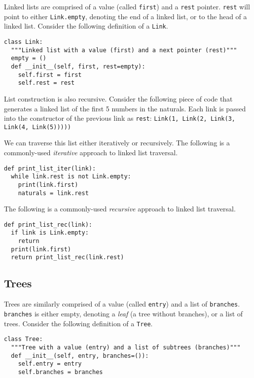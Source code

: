 \documentclass[a4paper]{book}
\begin{document}
Linked lists are comprised of a value (called {\tt first}) and a {\tt rest} pointer. {\tt rest} will point to either {\tt Link.empty}, denoting the end of a linked list, or to the head of a linked list. Consider the following definition of a {\tt Link}.

\begin{lstlisting}
class Link:
  """Linked list with a value (first) and a next pointer (rest)"""
  empty = ()
  def __init__(self, first, rest=empty):
    self.first = first
    self.rest = rest
\end{lstlisting}

List construction is also recursive. Consider the following piece of code that generates a linked list of the first 5 numbers in the naturals. Each link is passed into the constructor of the previous link as {\tt rest}: {\tt Link(1, Link(2, Link(3, Link(4, Link(5)))))}

We can traverse this list either iteratively or recursively. The following is a commonly-used \textit{iterative} approach to linked list traversal.

\begin{lstlisting}
def print_list_iter(link):
  while link.rest is not Link.empty:
    print(link.first)
    naturals = link.rest
\end{lstlisting}

The following is a commonly-used \textit{recursive} approach to linked list traversal.

\begin{lstlisting}
def print_list_rec(link):
  if link is Link.empty:
  	return
  print(link.first)
  return print_list_rec(link.rest)
\end{lstlisting}

\subsection{Trees}

Trees are similarly comprised of a value (called {\tt entry}) and a list of {\tt branches}. {\tt branches} is either empty, denoting a \textit{leaf} (a tree without branches), or a list of trees. Consider the following definition of a {\tt Tree}.

\begin{lstlisting}
class Tree:
  """Tree with a value (entry) and a list of subtrees (branches)"""
  def __init__(self, entry, branches=()):
    self.entry = entry
    self.branches = branches
\end{lstlisting}
\end{document}
